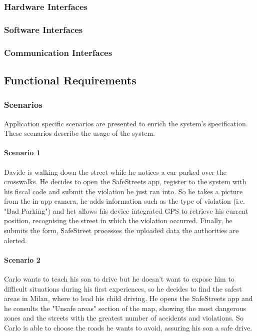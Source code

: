 \clearpage

\subsubsection{Hardware Interfaces}
	
\subsubsection{Software Interfaces}
\subsubsection{Communication Interfaces}

\clearpage

\subsection{Functional Requirements}

\subsubsection{Scenarios}

Application specific scenarios are presented to enrich the system's specification. These scenarios describe the usage of the system.

\paragraph{Scenario 1}
\label{scenario:1}
	Davide is walking down the street while he notices a car parked over the crosswalks. He decides to open the SafeStreets app, register to the system with his fiscal code and submit the violation he just ran into. So he takes a picture from the in-app camera, he adds information such as the type of violation (i.e. "Bad Parking") and het allows his device integrated GPS to retrieve his current position, recognising the street in which the violation occurred. Finally, he submits the form, SafeStreet processes the uploaded data the authorities are alerted.

\paragraph{Scenario 2}
\label{scenario:2}
	Carlo wants to teach his son to drive but he doesn't want to expose him to difficult situations during his first experiences, so he decides to find the safest areas in Milan, where to lead his child driving. He opens the SafeStreets app and he consults the "Unsafe areas" section of the map, showing the most dangerous zones and the streets with the greatest number of accidents and violations. So Carlo is able to choose the roads he wants to avoid, assuring his son a safe drive.

